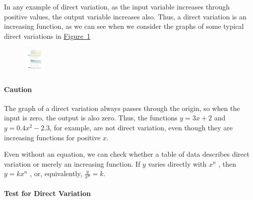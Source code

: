 \documentclass[10pt,]{book}
\theoremstyle{plain}
\theoremstyle{definition}
\theoremstyle{definition}
\theoremstyle{definition}
\theoremstyle{definition}
\theoremstyle{definition}
\numberwithin{equation}{section}
\begin{document}
	In any example of direct variation, as the input variable increases through positive values, the output variable increases also. Thus, a direct variation is an increasing function, as we can see when we consider the graphs of some typical direct variations in \hyperref[fig-vary-with-power]{Figure~\ref{fig-vary-with-power}}
%
\leavevmode%
\begin{figure}
\centering
\includegraphics[width=0.100\textwidth,]{images/fig-vary-with-power.pdf}\caption{\label{fig-vary-with-power}}
\end{figure}
\typeout{************************************************}
\typeout{************************************************}
\paragraph[Caution]{Caution}\label{paragraphs-39}

	The graph of a direct variation always passes through the origin, so when the input is zero, the output is also zero. Thus, the functions \(y = 3x + 2\) and \(y = 0.4x^2 − 2.3\), for example, are not direct variation, even though they are increasing functions for positive \(x\).
%
\par

	Even without an equation, we can check whether a table of data describes direct variation or merely an increasing function. If \(y\) varies directly with \(x^n\) , then \(y = kx^n\) , or, equivalently,
	\(\frac{y}{x^n} = k\).
%
\typeout{************************************************}
\typeout{************************************************}
\paragraph[Test for Direct Variation]{Test for Direct Variation}\label{paragraphs-40}
%
\par
\end{document}
